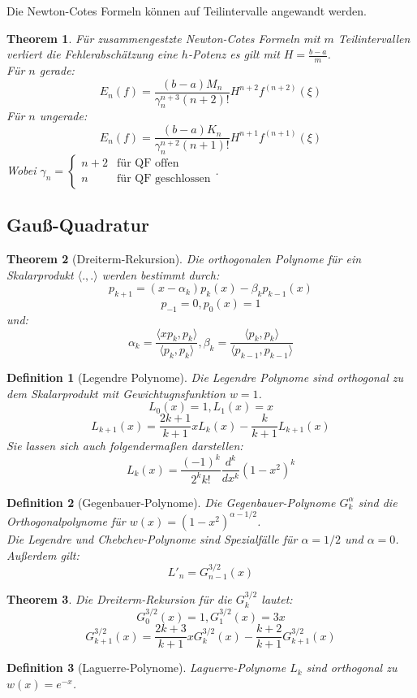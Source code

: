 \documentclass[10pt,a4paper]{article}
\newtheorem{theorem}{Theorem}
\newtheorem{definition}{Definition}
\begin{document}
	Die Newton-Cotes Formeln können auf Teilintervalle angewandt werden.
	\begin{theorem}
		Für zusammengestzte Newton-Cotes Formeln mit $m$ Teilintervallen verliert die Fehlerabschätzung eine $h$-Potenz es gilt mit $H=\frac{b-a}{m}$. \\
		Für $n$ gerade:
		$$E_n(f) = \frac{(b-a)M_n}{\gamma^{n+3}_n(n+2)!}H^{n+2}f^{(n+2)}(\xi)$$
		Für $n$ ungerade:
		$$E_n(f) = \frac{(b-a)K_n}{\gamma^{n+2}_n(n+1)!}H^{n+1}f^{(n+1)}(\xi)$$
		Wobei $\gamma_n= \begin{cases}
			n+2 & \text{für QF offen} \\
			n & \text{für QF geschlossen}
		\end{cases}$.
	\end{theorem}
	\subsection{Gauß-Quadratur}
	\begin{theorem}[Dreiterm-Rekursion]
		Die orthogonalen Polynome für ein Skalarprodukt $\langle., .\rangle$ werden bestimmt durch:
		$$p_{k+1} = (x-\alpha_k)p_k(x) - \beta_kp_{k-1}(x)$$
		$$p_{-1}=0, p_0(x)=1$$
		und:
		$$\alpha_k=\frac{\langle x p_k, p_k\rangle}{\langle p_k, p_k\rangle}, \beta_k=\frac{\langle p_k, p_k\rangle}{\langle p_{k-1}, p_{k-1}\rangle}$$
	\end{theorem}
	\begin{definition}[Legendre Polynome]
		Die Legendre Polynome sind orthogonal zu dem Skalarprodukt mit Gewichtugnsfunktion $w=1$. 
		$$L_0(x)=1, L_1(x)=x$$
		$$L_{k+1}(x) = \frac{2k+1}{k+1}xL_k(x) -\frac{k}{k+1}L_{k+1}(x)$$
		Sie lassen sich auch folgendermaßen darstellen:
		$$L_k(x) = \frac{(-1)^k}{2^k k!} \frac{d^k}{dx^k}(1-x^2)^k$$
	\end{definition}
	\begin{definition}[Gegenbauer-Polynome]
		Die Gegenbauer-Polynome $G^\alpha_k$ sind die Orthogonalpolynome für $w(x) = (1-x^2)^{\alpha-1/2}$. \\
		Die Legendre und Chebchev-Polynome sind Spezialfälle für $\alpha=1/2$ und $\alpha=0$. Außerdem gilt:
		$$L'_n = G^{3/2}_{n-1}(x)$$
	\end{definition}
	\begin{theorem}
		Die Dreiterm-Rekursion für die $G^{3/2}_k$ lautet:
		$$G^{3/2}_0(x)=1, G^{3/2}_1(x)=3x$$
		$$G^{3/2}_{k+1}(x) = \frac{2k+3}{k+1}xG^{3/2}_k(x) -\frac{k+2}{k+1}G^{3/2}_{k+1}(x)$$
	\end{theorem}
	\begin{definition}[Laguerre-Polynome]
		Laguerre-Polynome $L_k$ sind orthogonal zu $w(x) = e^{-x}$.
	\end{definition}
\end{document}
